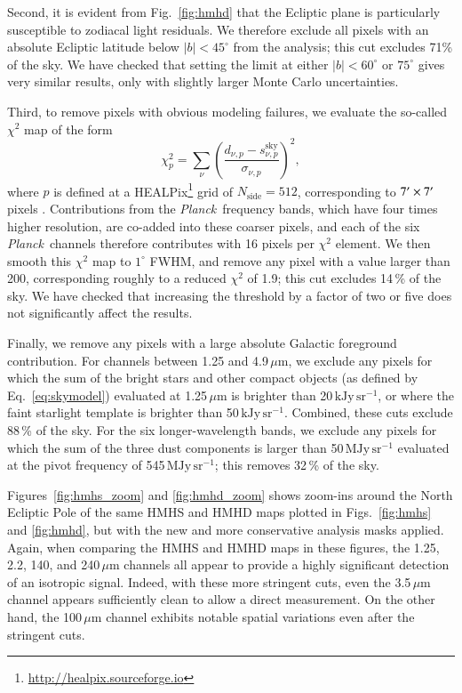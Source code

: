\documentclass{aa}
\def\Planck{\textit{Planck}}
\begin{document}
Second, it is evident from Fig.~\ref{fig:hmhd} that the Ecliptic
plane is particularly susceptible to zodiacal light residuals. We
therefore exclude all pixels with an absolute Ecliptic latitude below
$|b|<45^{\circ}$ from the analysis; this cut excludes 71\% of the
sky. We have checked that setting the limit at either $|b|<60^{\circ}$
or $75^{\circ}$ gives very similar results, only with slightly larger
Monte Carlo uncertainties.

Third, to remove pixels with obvious modeling failures, we
evaluate the so-called $\chi^2$ map of the form
\begin{equation}
\chi_p^2 = \sum_{\nu} \left(\frac{d_{\nu,p}-s_{\nu,p}^{\mathrm{sky}}}{\sigma_{\nu,p}}\right)^2,
\end{equation}
where $p$ is defined at a HEALPix\footnote{\url{http://healpix.sourceforge.io}} grid of $N_{\mathrm{side}}=512$,
corresponding to $7\arcmin\times 7\arcm$ pixels
\citep{healpix}. Contributions from the \Planck\ frequency bands,
which have four times higher resolution, are co-added into these
coarser pixels, and each of the six \Planck\ channels therefore
contributes with 16 pixels per $\chi^2$ element. We then smooth this
$\chi^2$ map to $1^{\circ}$ FWHM, and remove any pixel with a value
larger than 200, corresponding roughly to a reduced $\chi^2$ of 1.9;
this cut excludes 14\,\% of the sky. We have checked that increasing the
threshold by a factor of two or five does not significantly affect the
results.

Finally, we remove any pixels with a large absolute Galactic
foreground contribution. For channels between 1.25 and
4.9\,$\mu\mathrm{m}$, we exclude any pixels for which the sum of the
bright stars and other compact objects (as defined by
Eq.~\ref{eq:skymodel}) evaluated at 1.25\,$\mu\mathrm{m}$ is brighter
than 20\,$\mathrm{kJy\,sr^{-1}}$, or where the faint starlight template is brighter
than 50\,$\mathrm{kJy\,sr^{-1}}$. Combined, these cuts exclude 88\,\% of the sky. For
the six longer-wavelength bands, we exclude any pixels for which the
sum of the three dust components is larger than 50\,$\mathrm{MJy\,sr^{-1}}$ evaluated
at the pivot frequency of 545\,$\mathrm{MJy\,sr^{-1}}$; this removes 32\,\% of the sky.


Figures~\ref{fig:hmhs_zoom} and \ref{fig:hmhd_zoom} shows zoom-ins
around the North Ecliptic Pole of the same HMHS and HMHD maps plotted
in Figs.~\ref{fig:hmhs} and \ref{fig:hmhd}, but with the new and more
conservative analysis masks applied. Again, when comparing the HMHS
and HMHD maps in these figures, the 1.25, 2.2, 140, and
240$\,\mu\mathrm{m}$ channels all appear to provide a highly
significant detection of an isotropic signal. Indeed, with these more
stringent cuts, even the 3.5$\,\mu\mathrm{m}$ channel appears
sufficiently clean to allow a direct measurement. On the other hand,
the 100$\,\mu\mathrm{m}$ channel exhibits notable spatial variations
even after the stringent cuts.
\end{document}
